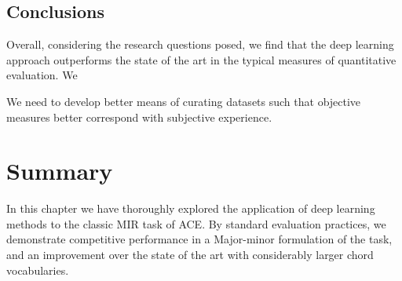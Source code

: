 \subsection{Conclusions}
\label{subsec:conclusions}

Overall, considering the research questions posed, we find that the deep learning approach outperforms the state of the art in the typical measures of quantitative evaluation.
We

We need to develop better means of curating datasets such that objective measures better correspond with subjective experience.


\section{Summary}
\label{sec:summary}

In this chapter we have thoroughly explored the application of deep learning methods to the classic MIR task of ACE.
By standard evaluation practices, we demonstrate competitive performance in a Major-minor formulation of the task, and an improvement over the state of the art with considerably larger chord vocabularies.
